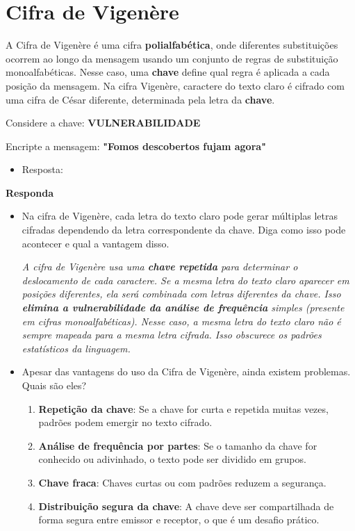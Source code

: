 \section{Cifra de Vigenère}

A Cifra de Vigenère é uma cifra \textbf{polialfabética}, onde diferentes substituições ocorrem ao longo da mensagem usando um conjunto de regras de substituição monoalfabéticas. Nesse caso, uma \textbf{chave} define qual regra é aplicada a cada posição da mensagem. Na cifra Vigenère, caractere do texto claro é cifrado com uma cifra de César diferente, determinada pela letra da \textbf{chave}.

Considere a chave: \textbf{VULNERABILIDADE}

Encripte a mensagem: \textbf{"Fomos descobertos fujam agora"}

\begin{itemize}
    \item Resposta: 
\end{itemize}


\textbf{Responda}
\begin{itemize}
    \item Na cifra de Vigenère, cada letra do texto claro pode gerar múltiplas letras cifradas dependendo da letra correspondente da chave. Diga como isso pode acontecer e qual a vantagem disso.

    \textit{A cifra de Vigenère usa uma \textbf{chave repetida} para determinar o deslocamento de cada caractere. Se a mesma letra do texto claro aparecer em posições diferentes, ela será combinada com letras diferentes da chave.  Isso \textbf{elimina a vulnerabilidade da análise de frequência} simples (presente em cifras monoalfabéticas). Nesse caso, a mesma letra do texto claro não é sempre mapeada para a mesma letra cifrada. Isso obscurece os padrões estatísticos da linguagem.}

    \item Apesar das vantagens do uso da Cifra de Vigenère, ainda existem problemas. Quais são eles? 
\begin{enumerate}
    \item \textbf{Repetição da chave}: Se a chave for curta e repetida muitas vezes, padrões podem emergir no texto cifrado.
    \item \textbf{Análise de frequência por partes}: Se o tamanho da chave for conhecido ou adivinhado, o texto pode ser dividido em grupos.
    \item \textbf{Chave fraca}: Chaves curtas ou com padrões reduzem a segurança.
    \item \textbf{Distribuição segura da chave}: A chave deve ser compartilhada de forma segura entre emissor e receptor, o que é um desafio prático.
\end{enumerate}

    
\end{itemize}

